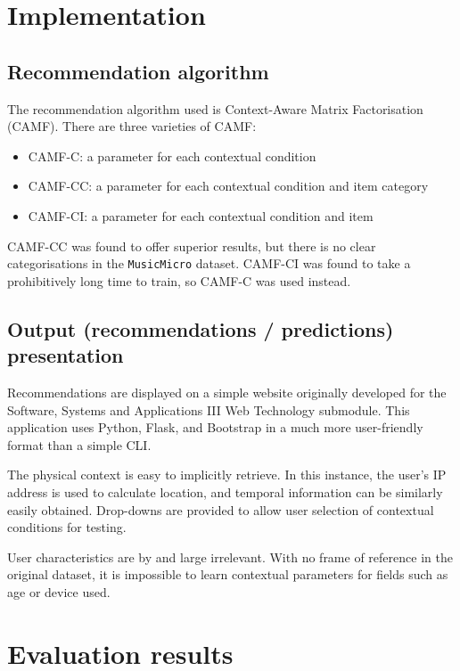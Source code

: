 \documentclass[conference]{IEEEtran}
\begin{document}
\section{Implementation}

\subsection{Recommendation algorithm}

The recommendation algorithm used is Context-Aware Matrix Factorisation (CAMF). There are three varieties of CAMF:

\begin{itemize}

	\item{CAMF-C: a parameter for each contextual condition}
	\item{CAMF-CC: a parameter for each contextual condition and item category}
	\item{CAMF-CI: a parameter for each contextual condition and item}

\end{itemize}

CAMF-CC was found to offer superior results, but there is no clear categorisations in the \verb|MusicMicro| dataset. CAMF-CI was found to take a prohibitively long time to train, so CAMF-C was used instead.

\subsection{Output (recommendations / predictions) presentation}

Recommendations are displayed on a simple website originally developed for the Software, Systems and Applications III Web Technology submodule. This application uses Python, Flask, and Bootstrap in a much more user-friendly format than a simple CLI.

The physical context is easy to implicitly retrieve. In this instance, the user's IP address is used to calculate location, and temporal information can be similarly easily obtained. Drop-downs are provided to allow user selection of contextual conditions for testing. 

User characteristics are by and large irrelevant. With no frame of reference in the original dataset, it is impossible to learn contextual parameters for fields such as age or device used. 


\section{Evaluation results}
\end{document}
